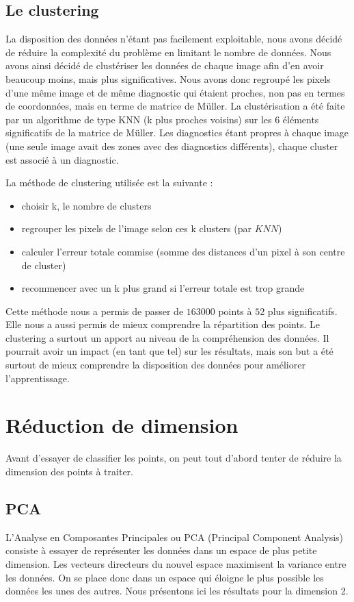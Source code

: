 \documentclass[a4paper,10pt]{report}
\begin{document}
\subsection{Le clustering}
La disposition des données n'étant pas facilement exploitable, nous avons décidé de réduire la complexité du problème en limitant le nombre de données. Nous avons ainsi décidé de clustériser les données de chaque image afin d'en avoir beaucoup moins, mais plus significatives. Nous avons donc regroupé les pixels d’une même image et de même diagnostic qui étaient proches, non pas en termes de coordonnées, mais en terme de matrice de Müller. La clustérisation a été faite par un algorithme de type KNN (k plus proches voisins) sur les $6$ éléments significatifs de la matrice de Müller. Les diagnostics étant propres à chaque image (une seule image avait des zones avec des diagnostics différents), chaque cluster est associé à un diagnostic. 

La méthode de clustering utilisée est la suivante :
\begin{itemize}
\item choisir k, le nombre de clusters
\item regrouper les pixels de l'image selon ces k clusters (par $KNN$)
\item calculer l'erreur totale commise (somme des distances d’un pixel à son centre de cluster)
\item recommencer avec un k plus grand si l'erreur totale est trop grande
\end{itemize}

Cette méthode nous a permis de passer de $163 000$ points à $52$ plus significatifs. Elle nous a aussi permis de mieux comprendre la répartition des points. Le clustering a surtout un apport au niveau de la compréhension des données. Il pourrait avoir un impact (en tant que tel) sur les résultats, mais son but a été surtout de mieux comprendre la disposition des données pour améliorer l’apprentissage.

\section{Réduction de dimension}

Avant d'essayer de classifier les points, on peut tout d’abord tenter de réduire la dimension des points à traiter.

\subsection{PCA}
L'Analyse en Composantes Principales ou PCA (Principal Component Analysis) consiste à essayer de représenter les données dans un espace de plus petite dimension. Les vecteurs directeurs du nouvel espace maximisent la variance entre les données. On se place donc dans un espace qui éloigne le plus possible les données les unes des autres. Nous présentons ici les résultats pour la dimension 2.
\end{document}

